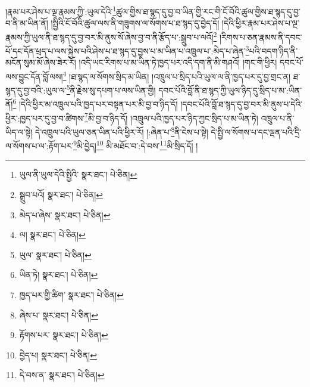 །རྣམ་པར་ཤེས་པ་ལྔ་རྣམས་ཀྱི་:ཡུལ་དེའི་\footnote{ཡུལ་ནི་ཡུལ་དེའི་སྤྱིའི་  སྣར་ཐང་།  པེ་ཅིན། }ཚུལ་གྱིས་ཐ་སྙད་དུ་བྱ་བ་ཡིན་གྱི་རང་གི་ངོ་བོའི་ཚུལ་གྱིས་ཐ་སྙད་དུ་བྱ་བ་ནི་མ་ཡིན་ནོ། །སྤྱིའི་ངོ་བོའི་ཚུལ་ལས་ནི་གཟུགས་ལ་སོགས་པ་ཐ་སྙད་དུ་བྱེད་དོ། །དེའི་ཕྱིར་རྣམ་པར་ཤེས་པ་ལྔ་རྣམས་ཀྱི་ཡུལ་ནི་ཐ་སྙད་དུ་བྱ་བར་མི་ནུས་སོ་ཞེས་བྱ་བ་ནི་རྩོད་པ་:སྒྲུབ་པ་ལའོ།\footnote{སྒྲུབ་པའོ།  སྣར་ཐང་།  པེ་ཅིན། } །རིགས་པ་ཅན་རྣམས་ནི་དབང་པོ་དང་དོན་ཕྲད་པ་ལས་སྐྱེས་པའི་ཤེས་པ་ཐ་སྙད་དུ་བྱས་པ་མ་ཡིན་པ་འཁྲུལ་པ་:མེད་པ་ཞེན་\footnote{མེད་པ་ཞེས་  སྣར་ཐང་།  པེ་ཅིན། }པའི་བདག་ཉིད་ནི་མངོན་སུམ་མོ་ཞེས་ཟེར་རོ། །འདི་ཡང་རིགས་པ་མ་ཡིན་ཏེ་ཁྱད་པར་འདི་དག་ནི་མི་གཤའོ། །གང་གི་ཕྱིར། དབང་པོ་ལས་བྱུང་དོན་བློ་ལས།\footnote{ལ།  སྣར་ཐང་།  པེ་ཅིན། } །ཐ་སྙད་ལ་སོགས་སྲིད་མ་ཡིན། །འཁྲུལ་པ་སྲིད་པའི་ཡུལ་ལ་ནི་ཁྱད་པར་དུ་བྱ་གྲང་ན། ཐ་སྙད་དུ་བྱ་བའི་:ཡུལ་ལ་\footnote{ཡུལ་  སྣར་ཐང་།  པེ་ཅིན། }ནི་རྗེས་སུ་དཔག་པ་ལས་ཡིན་གྱི། དབང་པོའི་བློ་ནི་ཐ་སྙད་ཀྱི་ཡུལ་ཉིད་དུ་སྲིད་པ་མ་:ཡིན་ནོ།\footnote{ཡིན་ཏེ།  སྣར་ཐང་།  པེ་ཅིན། } །དེའི་ཕྱིར་མ་འཁྲུལ་པའི་ཁྱད་པར་བསྟན་པར་མི་བྱ་བ་ཉིད་དོ། །དབང་པོའི་བློ་ཐ་སྙད་དུ་བྱ་བར་མི་ནུས་པ་དེའི་ཕྱིར་:ཁྱད་པར་དུ་བྱ་བ་ཚིགས་\footnote{ཁྱད་པར་གྱི་ཚིག་  སྣར་ཐང་།  པེ་ཅིན། }མི་བྱ་བ་ཉིད་དོ། །འཁྲུལ་པའི་ཁྱད་པར་ཉིད་ཀྱང་སྲིད་པ་མ་ཡིན་ཏེ། འཁྲུལ་པ་ནི་ཡིད་ལ་སྟེ། དེ་འཁྲུལ་པའི་ཡུལ་ཅན་ཡིན་པའི་ཕྱིར་རོ། །:ཞེན་པ་\footnote{ཞེས་པ་  སྣར་ཐང་།  པེ་ཅིན། }ནི་ངེས་པ་སྟེ། དེ་སྤྱི་ལ་སོགས་པ་དང་ལྡན་པའི་དྲི་ལ་སོགས་པ་ལ་:རྟོག་པར་\footnote{རྟོགས་པར་  སྣར་ཐང་།  པེ་ཅིན། }མི་བྱེད།\footnote{བྱེད་པ།  སྣར་ཐང་།  པེ་ཅིན། } མི་མཐོང་བ་:དེ་བས་\footnote{དེ་བས་ན་  སྣར་ཐང་།  པེ་ཅིན། }མི་སྲིད་དོ། །

